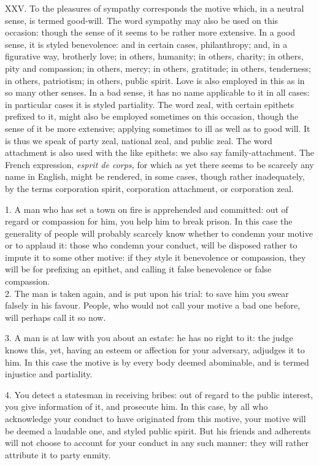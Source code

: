 \documentclass[12pt]{report}
\begin{document}
XXV. To the pleasures of sympathy corresponds the motive which, in a
neutral sense, is termed good-will. The word sympathy may also be used
on this occasion: though the sense of it seems to be rather more
extensive. In a good sense, it is styled benevolence: and in certain
cases, philanthropy; and, in a figurative way, brotherly love; in
others, humanity; in others, charity; in others, pity and compassion; in
others, mercy; in others, gratitude; in others, tenderness; in others,
patriotism; in others, public spirit. Love is also employed in this as
in so many other senses. In a bad sense, it has no name applicable to it
in all cases: in particular cases it is styled partiality. The word
zeal, with certain epithets prefixed to it, might also be employed
sometimes on this occasion, though the sense of it be more extensive;
applying sometimes to ill as well as to good will. It is thus we speak
of party zeal, national zeal, and public zeal. The word attachment is
also used with the like epithets: we also say family-attachment. The
French expression, \emph{esprit de corps,} for which as yet there seems
to be scarcely any name in English, might be rendered, in some cases,
though rather inadequately, by the terms corporation spirit, corporation
attachment, or corporation zeal.

1. A man who has set a town on fire is apprehended and committed: out of
regard or compassion for him, you help him to break prison. In this case
the generality of people will probably scarcely know whether to condemn
your motive or to applaud it: those who condemn your conduct, will be
disposed rather to impute it to some other motive: if they style it
benevolence or compassion, they will be for prefixing an epithet, and
calling it false benevolence or false compassion.\\
2. The man is taken again, and is put upon his trial: to save him you
swear falsely in his favour. People, who would not call your motive a
bad one before, will perhaps call it so now.

3. A man is at law with you about an estate: he has no right to it: the
judge knows this, yet, having an esteem or affection for your adversary,
adjudges it to him. In this case the motive is by every body deemed
abominable, and is termed injustice and partiality.

4. You detect a statesman in receiving bribes: out of regard to the
public interest, you give information of it, and prosecute him. In this
case, by all who acknowledge your conduct to have originated from this
motive, your motive will be deemed a laudable one, and styled public
spirit. But his friends and adherents will not choose to account for
your conduct in any such manner: they will rather attribute it to party
enmity.
\end{document}
